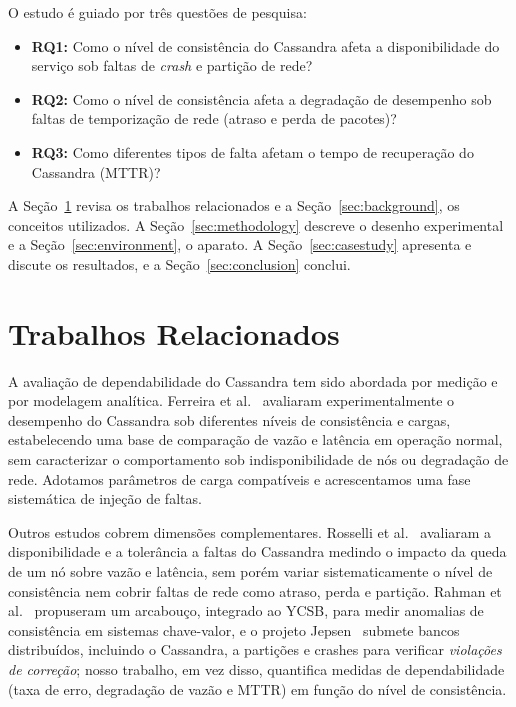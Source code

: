 \documentclass[runningheads]{llncs}
\begin{document}
O estudo é guiado por três questões de pesquisa:
\begin{itemize}
\item \textbf{RQ1:} Como o nível de consistência do Cassandra afeta a
disponibilidade do serviço sob faltas de \emph{crash} e partição de rede?
\item \textbf{RQ2:} Como o nível de consistência afeta a degradação de
desempenho sob faltas de temporização de rede (atraso e perda de pacotes)?
\item \textbf{RQ3:} Como diferentes tipos de falta afetam o tempo de
recuperação do Cassandra (MTTR)?
\end{itemize}

A Seção~\ref{sec:related} revisa os trabalhos relacionados e a
Seção~\ref{sec:background}, os conceitos utilizados. A
Seção~\ref{sec:methodology} descreve o desenho experimental e a
Seção~\ref{sec:environment}, o aparato. A Seção~\ref{sec:casestudy} apresenta e
discute os resultados, e a Seção~\ref{sec:conclusion} conclui.

\section{Trabalhos Relacionados}
\label{sec:related}

A avaliação de dependabilidade do Cassandra tem sido abordada por medição e por
modelagem analítica. Ferreira et al.~\cite{ferreira2021} avaliaram
experimentalmente o desempenho do Cassandra sob diferentes níveis de consistência
e cargas, estabelecendo uma base de comparação de vazão e latência em operação
normal, sem caracterizar o comportamento sob indisponibilidade de nós ou
degradação de rede. Adotamos parâmetros de carga compatíveis e acrescentamos uma
fase sistemática de injeção de faltas.

Outros estudos cobrem dimensões complementares. Rosselli et
al.~\cite{rosselli2016} avaliaram a disponibilidade e a tolerância a faltas do
Cassandra medindo o impacto da queda de um nó sobre vazão e latência, sem porém
variar sistematicamente o nível de consistência nem cobrir faltas de rede como
atraso, perda e partição. Rahman et al.~\cite{rahman2012} propuseram um
arcabouço, integrado ao YCSB, para medir anomalias de consistência em sistemas
chave-valor, e o projeto Jepsen~\cite{jepsen} submete bancos distribuídos,
incluindo o Cassandra, a partições e crashes para verificar \emph{violações de
correção}; nosso trabalho, em vez disso, quantifica medidas de dependabilidade
(taxa de erro, degradação de vazão e MTTR) em função do nível de consistência.
\end{document}
